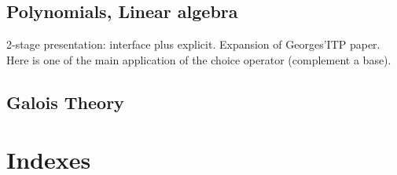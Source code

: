 \documentclass{book}
\begin{document}


\chapter{Polynomials, Linear algebra}

2-stage presentation: interface plus explicit. Expansion of
Georges'ITP paper. Here is one of the main application of the choice
operator (complement a base).




\chapter{Galois Theory}




% 

\part{Indexes}

\end{document}
